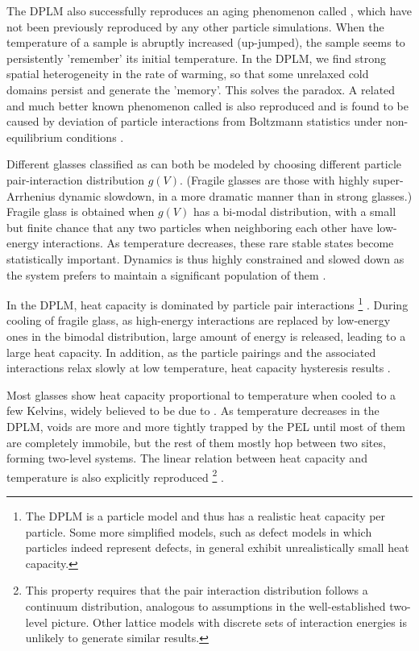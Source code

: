\documentclass[aps,rmp,tighten,twocolumn,floatfix,a4paper,longbibliography]{revtex4-1}
\begin{document}
{The DPLM also successfully reproduces an aging phenomenon called , which have not been previously reproduced by any other particle simulations. When the temperature of a sample is abruptly increased (up-jumped), the sample seems to persistently 'remember' its initial temperature. In  the DPLM, we find strong spatial heterogeneity in the rate of warming, so that some unrelaxed cold domains persist and generate the 'memory'. This solves the paradox.
A related and much better known phenomenon called  is also reproduced and is found to be caused by deviation of particle interactions from Boltzmann statistics under non-equilibrium conditions \cite{lulli2021}. 

Different glasses classified as  can both be modeled by choosing different particle pair-interaction distribution $g(V)$. (Fragile glasses are those with highly super-Arrhenius dynamic slowdown, in a more dramatic manner than in strong glasses.) Fragile glass is obtained when $g(V)$ has a bi-modal distribution, with a small but finite chance that any two particles when neighboring each other have low-energy interactions. As temperature decreases, these rare stable states become statistically important. Dynamics is thus highly constrained and slowed down as the system prefers to maintain a significant population of them \cite{lee2020}. 

 In the DPLM, heat capacity is dominated by particle pair interactions \footnote{The DPLM is a particle model and thus has a realistic heat capacity per particle. Some more simplified models, such as defect models in which particles indeed represent defects, in general exhibit unrealistically small heat capacity.} . During cooling of fragile glass, as high-energy interactions are replaced by low-energy ones in the bimodal distribution, large amount of energy is released, leading to a large heat capacity. In addition, as the particle pairings and the associated interactions relax slowly at low temperature, heat capacity hysteresis results \cite{lee2021}.

Most glasses show heat capacity proportional to temperature when cooled to a few Kelvins, widely believed to be due to . As temperature decreases in the DPLM, voids are more and more tightly trapped by the PEL until most of them are completely immobile, but the rest of them mostly hop between two sites, forming two-level systems. The linear relation between heat capacity and temperature is also explicitly reproduced \footnote{This property requires that the pair interaction distribution follows a continuum distribution, analogous to assumptions in the well-established two-level picture. Other lattice models with discrete sets of interaction energies is unlikely to generate similar results. } \cite{gao2021}.
}
\end{document}
